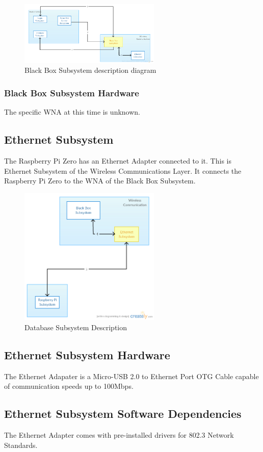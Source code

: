 \begin{figure}[h!]
	\centering
 	\includegraphics[width=0.60\textwidth]{images/ADSdiagrams/blackboxsubsystem.png}
 \caption{Black Box Subsystem description diagram}
\end{figure}

\subsubsection{Black Box Subsystem Hardware}
The specific WNA at this time is unknown.

\subsection{Ethernet Subsystem}
The Raspberry Pi Zero has an Ethernet Adapter connected to it. This is Ethernet Subsystem of the Wireless Communications Layer. It connects the Raspberry Pi Zero to the WNA of the Black Box Subsystem.

\begin{figure}[h!] 
 	\centering 
  	\includegraphics[width=0.60\textwidth]{images/ADSdiagrams/ethernetsubsystem.png} 
 \caption{Database Subsystem Description} 
\end{figure}

\subsection{Ethernet Subsystem Hardware}
The Ethernet Adapater is a Micro-USB 2.0 to Ethernet Port OTG Cable capable of communication speeds up to 100Mbps.

\subsection{Ethernet Subsystem Software Dependencies}
The Ethernet Adapter comes with pre-installed drivers for 802.3 Network Standards.

